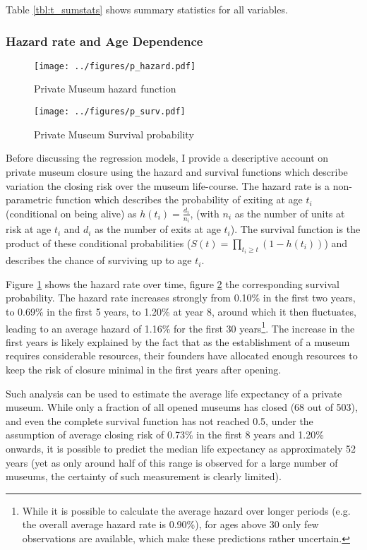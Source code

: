 \documentclass[12pt]{article}
\begin{document}
Table \ref{tbl:t_sumstats} shows summary statistics for all variables.
\subsubsection*{Hazard rate and Age Dependence}


\begin{figure}[htbp]
\centering
\texttt{[image: ../figures/p\_hazard.pdf]}
\caption{\label{fig:p_hazard}Private Museum hazard function}
\end{figure}

\begin{figure}[htbp]
\centering
\texttt{[image: ../figures/p\_surv.pdf]}
\caption{\label{fig:p_surv}Private Museum Survival probability}
\end{figure}


Before discussing the regression models, I provide a descriptive account on private museum closure using the hazard and survival functions which describe variation the closing risk over the museum life-course.
The hazard rate is a non-parametric function which describes the probability of exiting at age \(t_i\) (conditional on being alive) as \(h(t_i) = \frac{d_i}{n_i}\), (with \(n_i\) as the number of units at risk at age \(t_i\) and \(d_i\) as the number of exits at age \(t_i\)).
The survival function is the product of these conditional probabilities (\(S(t) = \prod_{t_i \geq t} \left(1-h(t_i) \right)\)) and describes the chance of surviving up to age \(t_i\). 



Figure \ref{fig:p_hazard} shows the hazard rate over time, figure \ref{fig:p_surv} the corresponding survival probability.
The hazard rate increases strongly from 0.10\% in the first two years, to 0.69\% in the first 5 years, to 1.20\% at year 8, around which it then fluctuates, leading to an average hazard of 1.16\% for the first 30 years\footnote{While it is possible to calculate the average hazard over longer periods (e.g. the overall average hazard rate is 0.90\%), for ages above 30 only few observations are available, which make these predictions rather uncertain.}.
The increase in the first years is likely explained by the fact that as the establishment of a museum requires considerable resources, their founders have allocated enough resources to keep the risk of closure minimal in the first years after opening.

Such analysis can be used to estimate the average life expectancy of a private museum.
While only a fraction of all opened museums has closed (68 out of 503), and even the complete survival function has not reached 0.5, under the assumption of average closing risk of 0.73\% in the first 8 years and 1.20\% onwards, it is possible to predict the median life expectancy as approximately 52 years (yet as only around half of this range is observed for a large number of museums, the certainty of such measurement is clearly limited).
\end{document}
